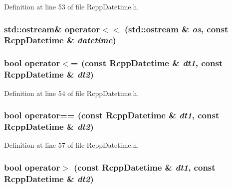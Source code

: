 Definition at line 53 of file RcppDatetime.h.\hypertarget{classRcppDatetime_a778b21a52b7f2b17978933c3ec27754e}{
\subsubsection[{operator$<$$<$}]{\setlength{\rightskip}{0pt plus 5cm}std::ostream\& operator$<$$<$ (std::ostream \& {\em os}, \/  const {\bf RcppDatetime} \& {\em datetime})}}
\label{classRcppDatetime_a778b21a52b7f2b17978933c3ec27754e}
\hypertarget{classRcppDatetime_a7d98733f95f5647ac10bb8236c1a7a8d}{
\subsubsection[{operator$<$=}]{\setlength{\rightskip}{0pt plus 5cm}bool operator$<$= (const {\bf RcppDatetime} \& {\em dt1}, \/  const {\bf RcppDatetime} \& {\em dt2})}}
\label{classRcppDatetime_a7d98733f95f5647ac10bb8236c1a7a8d}


Definition at line 54 of file RcppDatetime.h.\hypertarget{classRcppDatetime_ac6643666732e0a62c501da9f0ae9e342}{
\subsubsection[{operator==}]{\setlength{\rightskip}{0pt plus 5cm}bool operator== (const {\bf RcppDatetime} \& {\em dt1}, \/  const {\bf RcppDatetime} \& {\em dt2})}}
\label{classRcppDatetime_ac6643666732e0a62c501da9f0ae9e342}


Definition at line 57 of file RcppDatetime.h.\hypertarget{classRcppDatetime_a062107b2e2809a60c67f80da5dab77ed}{
\subsubsection[{operator$>$}]{\setlength{\rightskip}{0pt plus 5cm}bool operator$>$ (const {\bf RcppDatetime} \& {\em dt1}, \/  const {\bf RcppDatetime} \& {\em dt2})}}
\label{classRcppDatetime_a062107b2e2809a60c67f80da5dab77ed}


